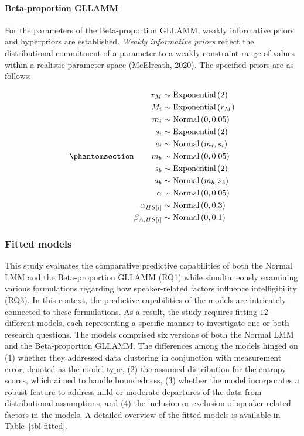 \documentclass[
]{agujournal2019}
\let\oldparagraph\paragraph
\renewcommand{\paragraph}[1]{\oldparagraph{#1}\mbox{}}
\begin{document}
\paragraph{Beta-proportion GLLAMM}\label{sec-M-SM-P-BGLLAMM}

For the parameters of the Beta-proportion GLLAMM, weakly informative
priors and hyperpriors are established. \emph{Weakly informative priors}
reflect the distributional commitment of a parameter to a weakly
constraint range of values within a realistic parameter space
(McElreath, 2020). The specified priors are as follows:

\begin{equation}\phantomsection\label{eq-beta-GLLAMM-priors}{
\begin{aligned}
r_{M} &\sim \text{Exponential}\left( 2 \right) \\ 
M_{i} &\sim \text{Exponential}\left( r_{M} \right) \\
m_{i} &\sim \text{Normal} \left( 0, 0.05 \right) \\
s_{i} &\sim \text{Exponential} \left( 2 \right) \\
e_{i} &\sim \text{Normal} \left( m_{i}, s_{i} \right) \\
m_{b} &\sim \text{Normal} \left( 0, 0.05 \right) \\
s_{b} &\sim \text{Exponential} \left( 2 \right) \\
a_{b} &\sim \text{Normal} \left( m_{b}, s_{b} \right) \\
\alpha &\sim \text{Normal} \left( 0, 0.05 \right) \\
\alpha_{HS[i]} &\sim \text{Normal} \left( 0, 0.3 \right) \\
\beta_{A,HS[i]} &\sim \text{Normal} \left( 0, 0.1 \right)
\end{aligned} 
}\end{equation}

\subsubsection{Fitted models}\label{sec-M-SM-FM}

This study evaluates the comparative predictive capabilities of both the
Normal LMM and the Beta-proportion GLLAMM (RQ1) while simultaneously
examining various formulations regarding how speaker-related factors
influence intelligibility (RQ3). In this context, the predictive
capabilities of the models are intricately connected to these
formulations. As a result, the study requires fitting \(12\) different
models, each representing a specific manner to investigate one or both
research questions. The models comprised six versions of both the Normal
LMM and the Beta-proportion GLLAMM. The differences among the models
hinged on (1) whether they addressed data clustering in conjunction with
measurement error, denoted as the model type, (2) the assumed
distribution for the entropy scores, which aimed to handle boundedness,
(3) whether the model incorporates a robust feature to address mild or
moderate departures of the data from distributional assumptions, and (4)
the inclusion or exclusion of speaker-related factors in the models. A
detailed overview of the fitted models is available in
Table~\ref{tbl-fitted}.
\end{document}
